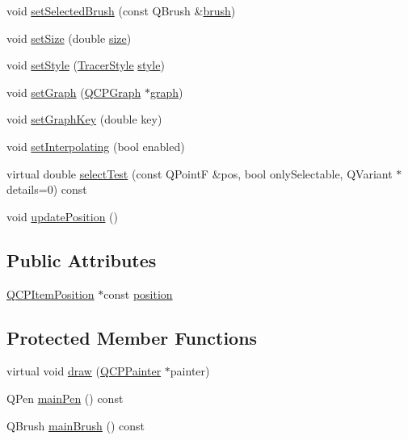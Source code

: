 \begin{DoxyCompactItemize}
\item 
void \hyperlink{classQCPItemTracer_a0f55c084980a7a312af859d3e7b558ef}{set\+Selected\+Brush} (const Q\+Brush \&\hyperlink{classQCPItemTracer_af07527750cfb6afc3c0ba4bec012011f}{brush})
\item 
void \hyperlink{classQCPItemTracer_ae47fe0617f5fef5fdb766999569be10a}{set\+Size} (double \hyperlink{classQCPItemTracer_a2607fcb3d01e90773ea1532fd6803760}{size})
\item 
void \hyperlink{classQCPItemTracer_a41a2ac4f1acd7897b4e2a2579c03204e}{set\+Style} (\hyperlink{classQCPItemTracer_a2f05ddb13978036f902ca3ab47076500}{Tracer\+Style} \hyperlink{classQCPItemTracer_a871832dace1709f877c3136fac7ae1ec}{style})
\item 
void \hyperlink{classQCPItemTracer_af5886f4ded8dd68cb4f3388f390790c0}{set\+Graph} (\hyperlink{classQCPGraph}{Q\+C\+P\+Graph} $\ast$\hyperlink{classQCPItemTracer_a74c90da0e6730839b8d7cf6445a4ec1f}{graph})
\item 
void \hyperlink{classQCPItemTracer_a6840143b42f3b685cedf7c6d83a704c8}{set\+Graph\+Key} (double key)
\item 
void \hyperlink{classQCPItemTracer_a6c244a9d1175bef12b50afafd4f5fcd2}{set\+Interpolating} (bool enabled)
\item 
virtual double \hyperlink{classQCPItemTracer_ae71f3728421c83c188c117279ca050fd}{select\+Test} (const Q\+PointF \&pos, bool only\+Selectable, Q\+Variant $\ast$details=0) const 
\item 
void \hyperlink{classQCPItemTracer_a5b90296109e36384aedbc8908a670413}{update\+Position} ()
\end{DoxyCompactItemize}
\subsection*{Public Attributes}
\begin{DoxyCompactItemize}
\item 
\hyperlink{classQCPItemPosition}{Q\+C\+P\+Item\+Position} $\ast$const \hyperlink{classQCPItemTracer_a69917e2fdb2b3a929c196958feee7cbe}{position}
\end{DoxyCompactItemize}
\subsection*{Protected Member Functions}
\begin{DoxyCompactItemize}
\item 
virtual void \hyperlink{classQCPItemTracer_aaaf49b48382c730ec9be0e74c2538315}{draw} (\hyperlink{classQCPPainter}{Q\+C\+P\+Painter} $\ast$painter)
\item 
Q\+Pen \hyperlink{classQCPItemTracer_af87132b7698d5bb35c96a8a0b9e7180e}{main\+Pen} () const 
\item 
Q\+Brush \hyperlink{classQCPItemTracer_aaf4e72e2d87f53279b9f9ba624961bf5}{main\+Brush} () const 
\end{DoxyCompactItemize}
